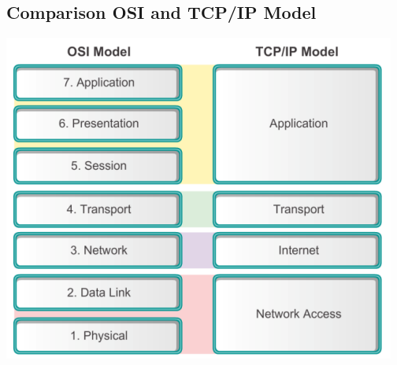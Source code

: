 \documentclass[11pt]{article}
\begin{document}
\subsection{Comparison OSI and TCP/IP Model}
\includegraphics[width=\textwidth]{comparison-osi-tcp-ip-model}
\end{document}
